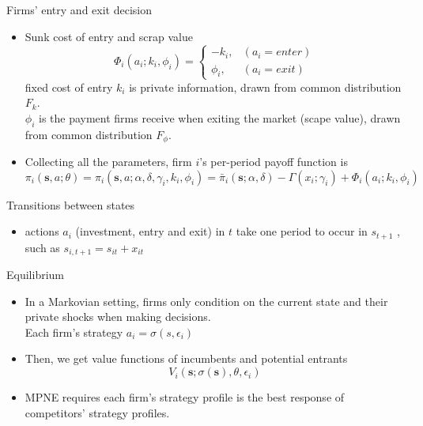\documentclass[aspectratio=169]{beamer}  %
\begin{document}
\begin{frame}{Firms' entry and exit decision}    
    \begin{itemize}
    
   \item Sunk cost of entry and scrap value \\

   \begin{equation}  
    \Phi_i(a_i;k_i,\phi_i)=\left\{  
     \begin{array}{lr}  
        -k_i, &(a_i=enter) \\
        \phi_i, &(a_i=exit)    
     \end{array}  
    \right.  
    \end{equation} 
    fixed cost of entry $k_i$ is private information, drawn from common distribution $F_k$. \\
    $\phi_i$ is the payment firms receive when exiting the market (scape value), drawn from common distribution $F_{\phi}$.
    \item Collecting all the parameters, firm $i$'s per-period payoff function is
    \[
    \pi_i(\mathbf{s}, a; \theta) =\pi_i(\mathbf{s}, a; \alpha, \delta, \gamma_i, k_i, \phi_i) =
    \bar{\pi}_i(\mathbf{s};\alpha, \delta)-\Gamma(x_i;\gamma_i)+ \Phi_i(a_i;k_i,\phi_i)
    \]
    
    \end{itemize}
\end{frame}

\begin{frame}{Transitions between states}    
    \begin{itemize}
    
    \item actions $a_i$ (investment, entry and exit) in $t$ take one period to occur in $s_{t+1}$
    , \\
    such as $s_{i,t+1}=s_{it}+x_{it}$
    
    \end{itemize}
\end{frame}

\begin{frame}{Equilibrium}    
    \begin{itemize}
    \item In a Markovian setting, firms only condition on the current state and their private shocks when making decisions. \\
    Each firm's strategy $a_i=\sigma(s,\epsilon_i)$
    \item Then, we get value functions of incumbents and potential entrants
    \[
    V_i(\mathbf{s}; \sigma(\mathbf{s}), \theta, \epsilon_i) 
    \]
    \item MPNE requires each firm's strategy profile is the best response of competitors' strategy profiles.
    
    \end{itemize}
\end{frame}
\end{document}
